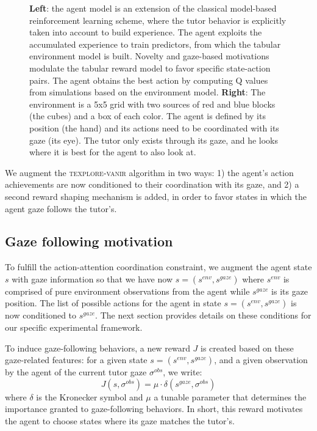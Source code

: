 \documentclass[letterpaper, 10 pt, conference]{ieeeconf}  %
\begin{document}
\begin{figure}
\begin{minipage}[b][\ht0][s]{.3\textwidth}
\end{minipage}
\caption{\textbf{Left}: the agent model is an extension of the classical model-based reinforcement learning scheme, where the tutor behavior is explicitly taken into account to build experience. The agent exploits the accumulated experience to train predictors, from which the tabular environment model is built. Novelty and gaze-based motivations modulate the tabular reward model to favor specific state-action pairs. The agent obtains the best action by computing Q values from simulations based on the environment model. \textbf{Right}: The environment is a 5x5 grid with two sources of red and blue blocks (the cubes) and a box of each color. The agent is defined by its position (the hand) and its actions need to be coordinated with its gaze (its eye). The tutor only exists through its gaze, and he looks where it is best for the agent to also look at. 
}
\label{model}
\end{figure}

We augment the \textsc{texplore-vanir} algorithm in two ways: 1) the agent's action achievements are now conditioned to their coordination with its gaze, and 2) a second reward shaping mechanism is added, in order to favor states in which the agent gaze follows the tutor's. 

\subsection{Gaze following motivation}

To fulfill the action-attention coordination constraint, we augment the agent state $s$ with gaze information so that we have now $s=(s^{env},s^{gaze})$ where $s^{env}$ is comprised of pure environment observations from the agent while $s^{gaze}$ is its gaze position. The list of possible actions for the agent in state  $s=(s^{env},s^{gaze})$ is now conditioned to $s^{gaze}$. The next section provides details on these conditions for our specific experimental framework. 

To induce gaze-following behaviors, a new reward $J$ is created based on these gaze-related features: for a given state $s=(s^{env},s^{gaze})$, and a given observation by the agent of the current tutor gaze $\sigma^{obs}$, we write: 
\begin{equation}
\label{eq:j}
J(s,\sigma^{obs}) = \mu \cdot \delta(s^{gaze},\sigma^{obs})
\end{equation} 
where $\delta$ is the Kronecker symbol and $\mu$ a tunable parameter that determines the importance granted to gaze-following behaviors. In short, this reward motivates the agent to choose states where its gaze matches the tutor's. 
\end{document}
